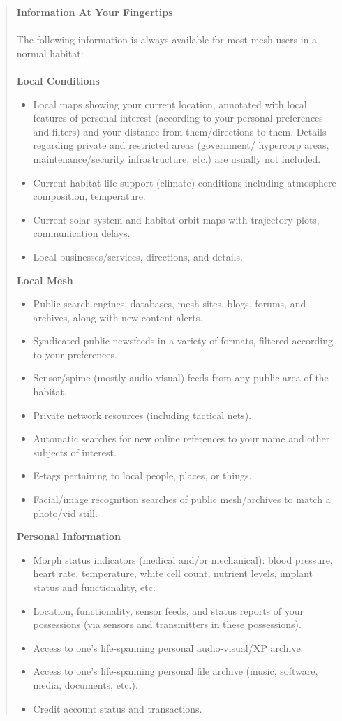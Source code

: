 \begin{quotation} \textbf{Information At Your Fingertips} \\ \\ The following information is always available for most mesh users in a normal habitat: \\ \\ \noindent \textbf{Local Conditions} \begin{itemize} \item Local maps showing your current location, annotated with local features of personal interest (according to your personal preferences and filters) and your distance from them/directions to them. Details regarding private and restricted areas (government/ hypercorp areas, maintenance/security infrastructure, etc.) are usually not included. \item Current habitat life support (climate) conditions including atmosphere composition, temperature. \item Current solar system and habitat orbit maps with trajectory plots, communication delays. \item Local businesses/services, directions, and details. \end{itemize} 

\noindent \textbf{Local Mesh} \begin{itemize} \item Public search engines, databases, mesh sites, blogs, forums, and archives, along with new content alerts. \item Syndicated public newsfeeds in a variety of formats, filtered according to your preferences. \item Sensor/spime (mostly audio-visual) feeds from any public area of the habitat. \item Private network resources (including tactical nets). \item Automatic searches for new online references to your name and other subjects of interest. \item E-tags pertaining to local people, places, or things. \item Facial/image recognition searches of public mesh/archives to match a photo/vid still. \end{itemize} 

\noindent \textbf{Personal Information} \begin{itemize} \item Morph status indicators (medical and/or mechanical): blood pressure, heart rate, temperature, white cell count, nutrient levels, implant status and functionality, etc. \item Location, functionality, sensor feeds, and status reports of your possessions (via sensors and transmitters in these possessions). \item Access to one’s life-spanning personal audio-visual/XP archive. \item Access to one’s life-spanning personal file archive (music, software, media, documents, etc.). \item Credit account status and transactions. \end{itemize} 


\end{quotation}
